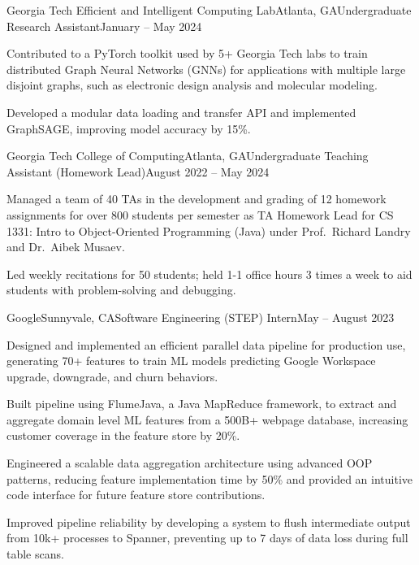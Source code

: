 \documentclass{article}
\begin{document}
\begin{flushleft}
    \begin{experience}{Georgia Tech Efficient and Intelligent Computing Lab}{Atlanta, GA}{Undergraduate Research Assistant}{January -- May 2024}
        \item Contributed to a PyTorch toolkit used by 5+ Georgia Tech labs to train distributed Graph Neural Networks (GNNs) for applications with multiple large disjoint graphs, such as electronic design analysis and molecular modeling.
        \item Developed a modular data loading and transfer API and implemented GraphSAGE, improving model accuracy by 15\%.
    \end{experience}

    \begin{experience}{Georgia Tech College of Computing}{Atlanta, GA}{Undergraduate Teaching Assistant (Homework Lead)}{August 2022 -- May 2024}
        \item Managed a team of 40 TAs in the development and grading of 12 homework assignments for over 800 students per semester as TA Homework Lead for CS 1331: Intro to Object-Oriented Programming (Java) under Prof.~Richard Landry and Dr.~Aibek Musaev.
        \item Led weekly recitations for 50 students; held 1-1 office hours 3 times a week to aid students with problem-solving and debugging.
    \end{experience}

    \begin{experience}{Google}{Sunnyvale, CA}{Software Engineering (STEP) Intern}{May -- August 2023}
        \item Designed and implemented an efficient parallel data pipeline for production use, generating 70+ features to train ML models predicting Google Workspace upgrade, downgrade, and churn behaviors.
        \item Built pipeline using FlumeJava, a Java MapReduce framework, to extract and aggregate domain level ML features from a 500B+ webpage database, increasing customer coverage in the feature store by 20\%.
        \item Engineered a scalable data aggregation architecture using advanced OOP patterns, reducing feature implementation time by 50\% and provided an intuitive code interface for future feature store contributions.
        \item Improved pipeline reliability by developing a system to flush intermediate output from 10k+ processes to Spanner, preventing up to 7 days of data loss during full table scans.
    \end{experience}


\end{flushleft}
\end{document}
